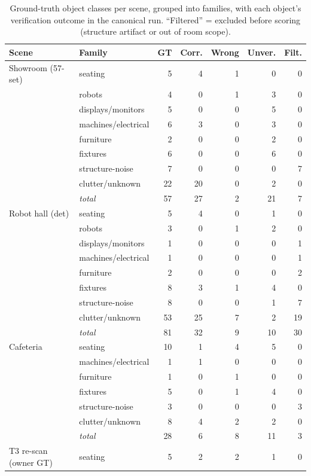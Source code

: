 \begin{table}[htbp]
\centering
\caption{Ground-truth object classes per scene, grouped into families, with
each object's verification outcome in the canonical run. ``Filtered'' =
excluded before scoring (structure artifact or out of room scope).}
\label{tab:classdist}
\small{}
\begin{tabular}{l l r r r r r}
\toprule
\textbf{Scene} & \textbf{Family} & GT & Corr. & Wrong & Unver. & Filt. \\
\midrule
Showroom (57-set) & seating & 5 & 4 & 1 & 0 & 0 \\
 & robots & 4 & 0 & 1 & 3 & 0 \\
 & displays/monitors & 5 & 0 & 0 & 5 & 0 \\
 & machines/electrical & 6 & 3 & 0 & 3 & 0 \\
 & furniture & 2 & 0 & 0 & 2 & 0 \\
 & fixtures & 6 & 0 & 0 & 6 & 0 \\
 & structure-noise & 7 & 0 & 0 & 0 & 7 \\
 & clutter/unknown & 22 & 20 & 0 & 2 & 0 \\
 & \emph{total} & 57 & 27 & 2 & 21 & 7 \\
\midrule
Robot hall (det) & seating & 5 & 4 & 0 & 1 & 0 \\
 & robots & 3 & 0 & 1 & 2 & 0 \\
 & displays/monitors & 1 & 0 & 0 & 0 & 1 \\
 & machines/electrical & 1 & 0 & 0 & 0 & 1 \\
 & furniture & 2 & 0 & 0 & 0 & 2 \\
 & fixtures & 8 & 3 & 1 & 4 & 0 \\
 & structure-noise & 8 & 0 & 0 & 1 & 7 \\
 & clutter/unknown & 53 & 25 & 7 & 2 & 19 \\
 & \emph{total} & 81 & 32 & 9 & 10 & 30 \\
\midrule
Cafeteria & seating & 10 & 1 & 4 & 5 & 0 \\
 & machines/electrical & 1 & 1 & 0 & 0 & 0 \\
 & furniture & 1 & 0 & 1 & 0 & 0 \\
 & fixtures & 5 & 0 & 1 & 4 & 0 \\
 & structure-noise & 3 & 0 & 0 & 0 & 3 \\
 & clutter/unknown & 8 & 4 & 2 & 2 & 0 \\
 & \emph{total} & 28 & 6 & 8 & 11 & 3 \\
\midrule
T3 re-scan (owner GT) & seating & 5 & 2 & 2 & 1 & 0 \\

\end{tabular}
\end{table}

